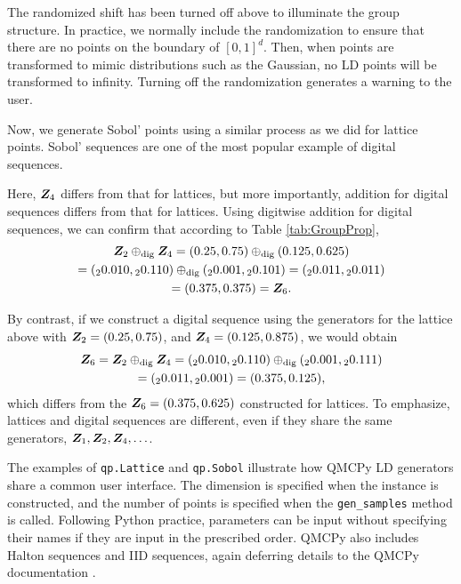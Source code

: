 \documentclass[graybox,footinfo]{svmult}
\newcommand{\dig}{\textup{dig}}
\begin{document}
The randomized shift has been turned off above to illuminate the group structure.  In practice, we normally include the randomization to ensure that there are no points on the boundary of $[0,1]^d$.  Then, when points are transformed to mimic distributions such as the Gaussian, no LD points will be transformed to infinity.  Turning off the randomization generates a warning to the user.

Now, we generate Sobol' points using a similar process as we did for lattice points.  Sobol' sequences are one of the most popular example of digital sequences.

Here, ${\boldsymbol{Z}}_4$ differs from that for lattices, but more importantly, addition for digital sequences differs from that for lattices.  Using digitwise addition for digital sequences, we can confirm that according to Table \ref{tab:GroupProp},
\begin{multline*}
\bsZ_2 \oplus_{\dig} \bsZ_4 = (0.25,0.75)  \oplus_{\dig} (0.125,0.625) \\
=  ({}_20.010,{}_20.110)  \oplus_{\dig} ({}_20.001,{}_20.101) = ({}_20.011,{}_20.011) \\
= (0.375,0.375) = \bsZ_6.
\end{multline*}

By contrast, if we construct a digital sequence using the generators for the lattice above with ${\boldsymbol{Z}}_2 = (0.25, 0.75)$, and ${\boldsymbol{Z}}_4 = (0.125, 0.875)$, we would obtain
\begin{multline*}
\bsZ_6 = \bsZ_2 \oplus_{\dig} \bsZ_4   = ({}_20.010,{}_20.110)  \oplus_{\dig} ({}_20.001,{}_20.111)  \\
= ({}_20.011,{}_20.001) = (0.375, 0.125),
\end{multline*}
which differs from the ${\boldsymbol{Z}}_6=(0.375, 0.625)$ constructed for lattices.  To emphasize, lattices and digital sequences are different, even if they share the same generators, ${\boldsymbol{Z}}_1, {\boldsymbol{Z}}_2, {\boldsymbol{Z}}_4, \ldots$.

The examples of \texttt{qp.Lattice} and \texttt{qp.Sobol} illustrate how QMCPy LD generators share a common user interface.  The dimension is specified when the instance is constructed, and the number of points is specified when the \texttt{gen\_samples} method is called.  Following Python practice, parameters can be input without specifying their names if they are input in the prescribed order.  QMCPy also includes Halton sequences and IID sequences, again deferring details to the QMCPy documentation \cite{QMCPyDocs}.
\end{document}
